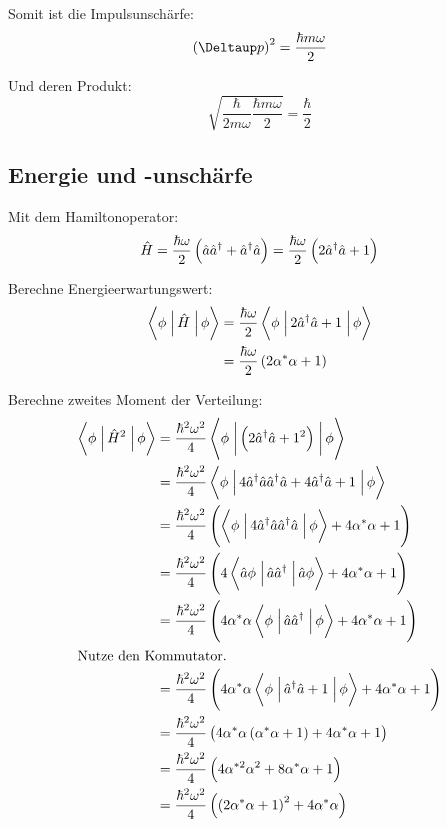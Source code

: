 Somit ist die Impulsunschärfe:
\[
	\del{\Deltaup p}^2 = \frac{\hbar m \omega}{2}
\]

Und deren Produkt:
\[
	\sqrt{
		\frac{\hbar}{2m\omega} 
		\frac{\hbar m \omega}{2}
	}
	= \frac \hbar2
\]

\subsection{Energie und -unschärfe}

Mit dem Hamiltonoperator:
\[
	\hat H
	= \frac{\hbar\omega}2 \del{\hat a \hat a^\dagger + \hat a^\dagger \hat a}
	= \frac{\hbar\omega}2 \del{2 \hat a^\dagger \hat a + 1}
\]

Berechne Energieerwartungswert:
\begin{align*}
	\braopket{\phi}{\hat H}{\phi}
	&= \frac{\hbar\omega}{2} \braopket{\phi}{2 \hat a^\dagger \hat a + 1}{\phi} \\
	&= \frac{\hbar\omega}2 \del{2 \alpha^* \alpha + 1}
\end{align*}

Berechne zweites Moment der Verteilung:
\begin{align*}
	\braopket{\phi}{\hat H^2}{\phi}
	&= \frac{\hbar^2\omega^2}{4} \braopket{\phi}{\del{2 \hat a^\dagger \hat a + 1^2}}{\phi} \\
	&= \frac{\hbar^2\omega^2}{4} \braopket{\phi}{4 \hat a^\dagger \hat a \hat a^\dagger \hat a + 4 \hat a^\dagger \hat a + 1}{\phi} \\
	&= \frac{\hbar^2\omega^2}{4} \del{\braopket{\phi}{4 \hat a^\dagger \hat a \hat a^\dagger \hat a}{\phi} + 4 \alpha^* \alpha + 1} \\
	&= \frac{\hbar^2\omega^2}{4} \del{4 \braopket{\hat a \phi}{\hat a \hat a^\dagger}{\hat a \phi} + 4 \alpha^* \alpha + 1} \\
	&= \frac{\hbar^2\omega^2}{4} \del{4 \alpha^* \alpha \braopket{\phi}{\hat a \hat a^\dagger}{\phi} + 4 \alpha^* \alpha + 1} \\
	\intertext{%
		Nutze den Kommutator.
	}
	&= \frac{\hbar^2\omega^2}{4} \del{4 \alpha^* \alpha \braopket{\phi}{\hat a^\dagger \hat a + 1}{\phi} + 4 \alpha^* \alpha + 1} \\
	&= \frac{\hbar^2\omega^2}{4} \del{4 \alpha^* \alpha \del{\alpha^* \alpha + 1} + 4 \alpha^* \alpha + 1} \\
	&= \frac{\hbar^2\omega^2}{4} \del{4 \alpha^{*2} \alpha^2 + 8 \alpha^* \alpha + 1} \\
	&= \frac{\hbar^2\omega^2}{4} \del{\del{2\alpha^* \alpha + 1}^2 + 4 \alpha^* \alpha}
\end{align*}

